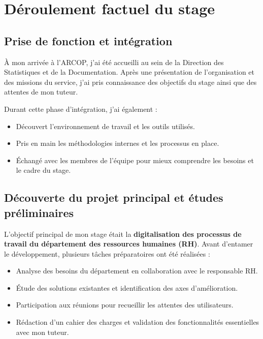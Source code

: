 \chapter{Déroulement factuel du stage}
\clearpage

\section{ Prise de fonction et intégration}
À mon arrivée à l’ARCOP, j’ai été accueilli au sein de la Direction des Statistiques et de la Documentation. Après une présentation de l’organisation et des missions du service, j’ai pris connaissance des objectifs du stage ainsi que des attentes de mon tuteur.

Durant cette phase d’intégration, j’ai également :
\begin{itemize}
    \item Découvert l’environnement de travail et les outils utilisés.
    \item Pris en main les méthodologies internes et les processus en place.
    \item Échangé avec les membres de l’équipe pour mieux comprendre les besoins et le cadre du stage.

\end{itemize}
\section{Découverte du projet principal et études préliminaires}
L’objectif principal de mon stage était la \textbf{digitalisation des processus de travail du département des ressources humaines (RH)}. Avant d’entamer le développement, plusieurs tâches préparatoires ont été réalisées :




\begin{itemize}
    \item Analyse des besoins du département en collaboration avec le responsable RH.
    \item Étude des solutions existantes et identification des axes d’amélioration.
    \item Participation aux réunions pour recueillir les attentes des utilisateurs.
    \item Rédaction d’un cahier des charges et validation des fonctionnalités essentielles avec mon tuteur.
\end{itemize}

